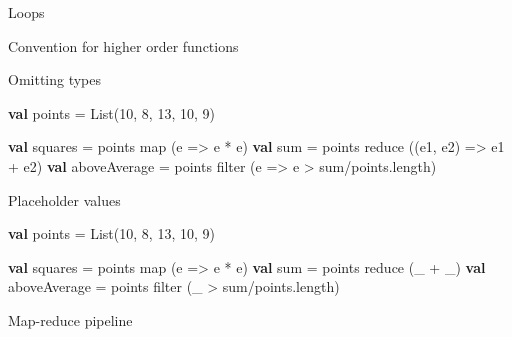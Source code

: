 \documentclass[ignorenonframetext,]{beamer}
\newenvironment{Shaded}{\begin{snugshade}}{\end{snugshade}}
\newcommand{\KeywordTok}[1]{\textcolor[rgb]{0.13,0.29,0.53}{\textbf{#1}}}
\newcommand{\DecValTok}[1]{\textcolor[rgb]{0.00,0.00,0.81}{#1}}
\newcommand{\FunctionTok}[1]{\textcolor[rgb]{0.00,0.00,0.00}{#1}}
\newcommand{\NormalTok}[1]{#1}
\begin{document}
\begin{frame}[fragile]{Loops}
\begin{block}{Convention for higher order functions}
\end{block}

\begin{block}{Omitting types}

\begin{Shaded}
\begin{Highlighting}[]
\KeywordTok{val}\NormalTok{ points = List(}\DecValTok{10}\NormalTok{, }\DecValTok{8}\NormalTok{, }\DecValTok{13}\NormalTok{, }\DecValTok{10}\NormalTok{, }\DecValTok{9}\NormalTok{)}
\end{Highlighting}
\end{Shaded}

\begin{Shaded}
\begin{Highlighting}[]
\KeywordTok{val}\NormalTok{ squares = points }\FunctionTok{map}\NormalTok{ (e => e * e)}
\KeywordTok{val}\NormalTok{ sum = points }\FunctionTok{reduce}\NormalTok{ ((e1, e2) => e1 + e2)}
\KeywordTok{val}\NormalTok{ aboveAverage = points }\FunctionTok{filter}\NormalTok{ (e => e > sum/points.}\FunctionTok{length}\NormalTok{)}
\end{Highlighting}
\end{Shaded}

\end{block}

\begin{block}{Placeholder values}

\begin{Shaded}
\begin{Highlighting}[]
\KeywordTok{val}\NormalTok{ points = List(}\DecValTok{10}\NormalTok{, }\DecValTok{8}\NormalTok{, }\DecValTok{13}\NormalTok{, }\DecValTok{10}\NormalTok{, }\DecValTok{9}\NormalTok{)}
\end{Highlighting}
\end{Shaded}

\begin{Shaded}
\begin{Highlighting}[]
\KeywordTok{val}\NormalTok{ squares = points }\FunctionTok{map}\NormalTok{ (e => e * e)}
\KeywordTok{val}\NormalTok{ sum = points }\FunctionTok{reduce}\NormalTok{ (_ + _)}
\KeywordTok{val}\NormalTok{ aboveAverage = points }\FunctionTok{filter}\NormalTok{ (_ > sum/points.}\FunctionTok{length}\NormalTok{)}
\end{Highlighting}
\end{Shaded}

\end{block}

\begin{block}{Map-reduce pipeline}


\end{block}
\end{frame}
\end{document}
